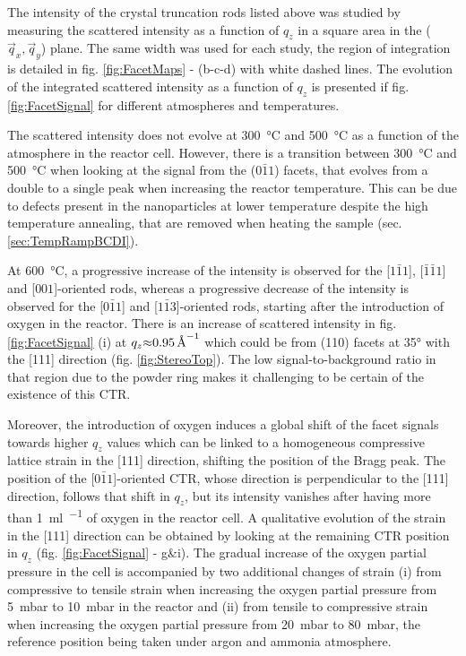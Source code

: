 The intensity of the crystal truncation rods listed above was studied by measuring the scattered intensity as a function of $q_z$ in a square area in the ($\vec{q}_x, \vec{q}_y$) plane.
The same width was used for each study, the region of integration is detailed in fig. \ref{fig:FacetMaps} - (b-c-d) with white dashed lines.
The evolution of the integrated scattered intensity as a function of $q_z$ is presented if fig. \ref{fig:FacetSignal} for different atmospheres and temperatures.

The scattered intensity does not evolve at \qty{300}{\degreeCelsius} and \qty{500}{\degreeCelsius} as a function of the atmosphere in the reactor cell.
However, there is a transition between \qty{300}{\degreeCelsius} and \qty{500}{\degreeCelsius} when looking at the signal from the ($0\bar{1}1$) facets, that evolves from a double to a single peak when increasing the reactor temperature.
This can be due to defects present in the nanoparticles at lower temperature despite the high temperature annealing, that are removed when heating the sample (sec. \ref{sec:TempRampBCDI}).

At \qty{600}{\degreeCelsius}, a progressive increase of the intensity is observed for the [$1\bar{1}1$], [$\bar{1}\bar{1}1$] and [$001$]-oriented rods, whereas a progressive decrease of the intensity is observed for the [$0\bar{1}1$] and [$1\bar{1}3$]-oriented rods, starting after the introduction of oxygen in the reactor.
There is an increase of scattered intensity in fig. \ref{fig:FacetSignal} (i) at $q_z \qty{\approx 0.95}{\per\angstrom}$ which could be from (110) facets at \ang{35} with the [111] direction (fig. \ref{fig:StereoTop}).
The low signal-to-background ratio in that region due to the powder ring makes it challenging to be certain of the existence of this CTR.

Moreover, the introduction of oxygen induces a global shift of the facet signals towards higher $q_z$ values which can be linked to a homogeneous compressive lattice strain in the [111] direction, shifting the position of the Bragg peak.
The position of the [$0\bar{1}1$]-oriented CTR, whose direction is perpendicular to the [111] direction, follows that shift in $q_z$, but its intensity vanishes after having more than \qty{1}{\ml\per\min} of oxygen in the reactor cell.
A qualitative evolution of the strain in the [111] direction can be obtained by looking at the remaining CTR position in $q_z$ (fig. \ref{fig:FacetSignal} - g\&i).
The gradual increase of the oxygen partial pressure in the cell is accompanied by two additional changes of strain (i) from compressive to tensile strain when increasing the oxygen partial pressure from \qty{5}{\milli\bar} to \qty{10}{\milli\bar} in the reactor and (ii) from tensile to compressive strain when increasing the oxygen partial pressure from \qty{20}{\milli\bar} to \qty{80}{\milli\bar}, the reference position being taken under argon and ammonia atmosphere.

